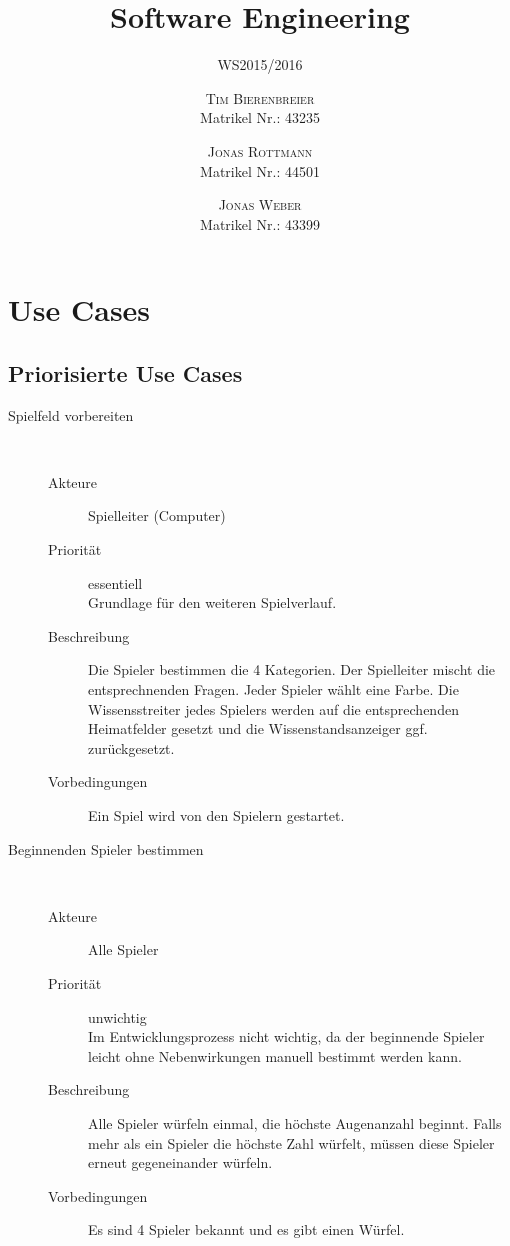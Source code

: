 \documentclass{scrartcl} %
\title{Software Engineering}
\subtitle{WS2015/2016} %
\author{
	\textsc{Tim Bierenbreier}\\
	\normalsize Matrikel Nr.: 43235
	\and
	\textsc{Jonas Rottmann}\\
	\normalsize Matrikel Nr.: 44501
	\and
	\textsc{Jonas Weber}\\
	\normalsize Matrikel Nr.: 43399
}
\begin{document}
\maketitle
\section{Use Cases}
\subsection{Priorisierte Use Cases}

\begin{description}
   \item[Spielfeld vorbereiten]~\par
   \begin{description}
      \item[Akteure] Spielleiter (Computer)
      \item[Priorität] essentiell\\Grundlage für den weiteren Spielverlauf.
      \item[Beschreibung] Die Spieler bestimmen die 4 Kategorien. Der Spielleiter mischt die entsprechnenden Fragen. Jeder Spieler wählt eine Farbe. Die Wissensstreiter jedes Spielers werden auf die entsprechenden Heimatfelder gesetzt und die Wissenstandsanzeiger ggf. zurückgesetzt.
      \item[Vorbedingungen] Ein Spiel wird von den Spielern gestartet.          
   \end{description}
   

   \item[Beginnenden Spieler bestimmen]~\par
   \begin{description}
      \item[Akteure] Alle Spieler
      \item[Priorität] unwichtig\\Im Entwicklungsprozess nicht wichtig, da der beginnende Spieler leicht ohne Nebenwirkungen manuell bestimmt werden kann.
      \item[Beschreibung] Alle Spieler würfeln einmal, die höchste Augenanzahl beginnt. Falls mehr als ein Spieler die höchste Zahl würfelt, müssen diese Spieler erneut gegeneinander würfeln.
      \item[Vorbedingungen] Es sind 4 Spieler bekannt und es gibt einen Würfel.
   \end{description}
   


\end{description}
\end{document}

